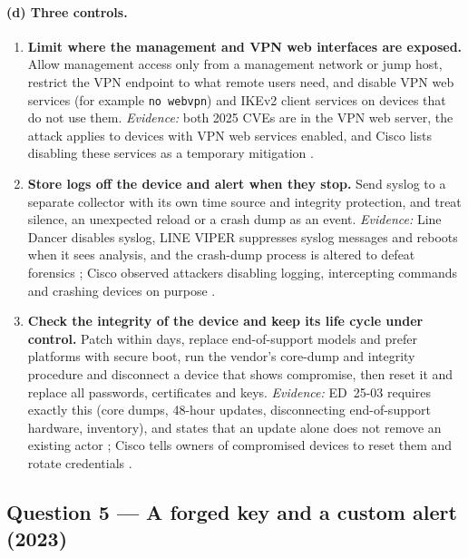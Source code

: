 \documentclass[11pt,a4paper]{article}
\newcommand{\code}[1]{\texttt{#1}}
\begin{document}
\paragraph{(d) Three controls.}
\begin{enumerate}[label=(\arabic*)]
\item \textbf{Limit where the management and VPN web interfaces are exposed.} Allow management access only from a management network or jump host, restrict the VPN endpoint to
what remote users need, and disable VPN web services (for example \code{no webvpn}) and IKEv2 client services on devices that do not use them. \emph{Evidence:} both 2025 CVEs are in the VPN
web server, the attack applies to devices with VPN web services enabled, and Cisco lists disabling these services as a temporary mitigation \cite{ciscoevent,ciscoadv}.
\item \textbf{Store logs off the device and alert when they stop.} Send syslog to a separate collector with its own time source and integrity protection, and treat silence, an unexpected
reload or a crash dump as an event. \emph{Evidence:} Line Dancer disables syslog, LINE VIPER suppresses syslog messages and reboots when it sees analysis, and the crash-dump process is altered to defeat
forensics \cite{talos,ncscmar}; Cisco observed attackers disabling logging, intercepting commands and crashing devices on purpose \cite{ciscoevent}.
\item \textbf{Check the integrity of the device and keep its life cycle under control.} Patch within days, replace end-of-support models and prefer platforms with secure boot, run the
vendor's core-dump and integrity procedure and disconnect a device that shows compromise, then reset it and replace all passwords, certificates and keys. \emph{Evidence:} ED~25-03 requires exactly
this (core dumps, 48-hour updates, disconnecting end-of-support hardware, inventory), and states that an update alone does not remove an existing actor \cite{ed2503}; Cisco tells owners of compromised
devices to reset them and rotate credentials \cite{ciscoevent}.
\end{enumerate}

\subsection*{Question 5 --- A forged key and a custom alert (2023)}
\end{document}
